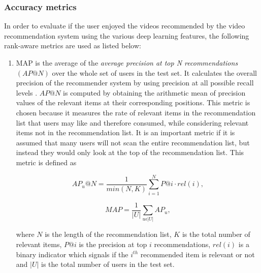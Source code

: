 \documentclass[review]{elsarticle}
\begin{document}
\subsubsection{Accuracy metrics}\label{sec:accuracy_metrics}
In order to evaluate if the user enjoyed the videos recommended by the video recommendation system using the various deep learning features, the following rank-aware metrics are used as listed below:\\

\begin{enumerate}
    
    \item \ac{MAP} is the average of the \textit{average precision at top N recommendations} $(AP@N)$ over the whole set of users in the test set. It calculates the overall precision of the recommender system by using precision at all possible recall levels \citep{deldjoo2019movie}. $AP@N$ is computed by obtaining the arithmetic mean of precision values of the relevant items at their corresponding positions. This metric is chosen because it measures the rate of relevant items in the recommendation list that users may like and therefore consumed, while considering relevant items not in the recommendation list. It is an important metric if it is assumed that many users will not scan the entire recommendation list, but instead they would only look at the top of the recommendation list. This metric is defined as \citep{deldjoo2019movie} 
    
    \begin{equation}
        AP_u@N = \frac{1}{min(N,K)} \sum^{N}_{i=1}P@i \cdot rel(i) ,
        \label{AP}
    \end{equation}
    
    \begin{equation}
        MAP = \frac{1}{|U|}\sum_{u \epsilon |U|}AP_{u},
    \end{equation}
    
    where $N$ is the length of the recommendation list, $K$ is the total number of relevant items, $P@i$ is the precision at top $i$ recommendations, $rel(i)$ is a binary indicator which signals if the $i^{th}$ recommended item is relevant or not and $|U|$ is the total number of users in the test set.\\ 
    

\end{enumerate}
\end{document}
